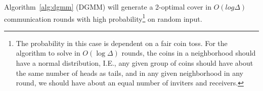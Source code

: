 \begin{thm}
  Algorithm~\ref{alg:dgmm} (DGMM) will generate a 2-optimal cover in $O(log \Delta)$ communication rounds with high probability\footnote{The probability in this case is dependent on a fair coin toss. For the algorithm to solve in $O(\log{\Delta})$ rounds, the coins in a neighborhood should have a normal distribution, I.E., any given group of coins should have about the same number of heads as tails, and in any given neighborhood in any round, we should have about an equal number of inviters and receivers.} on random input.
\label{thm:dgmm-term}
\end{thm}
